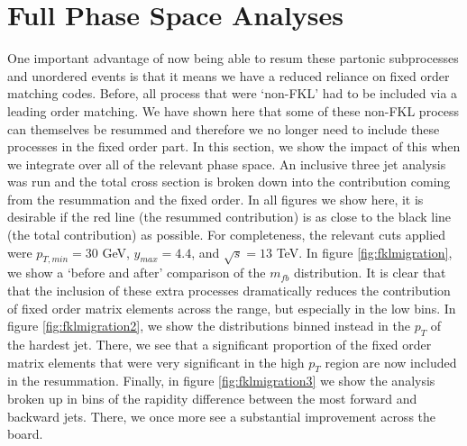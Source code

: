 \section{Full Phase Space Analyses}

One important advantage of now being able to resum these partonic subprocesses and unordered events is that it means we have a reduced reliance on fixed order matching codes. Before, all process that were `non-FKL' had to be included via a leading order matching. We have shown here that some of these non-FKL process can themselves be resummed and therefore we no longer need to include these processes in the fixed order part. In this section, we show the impact of this when we integrate over all of the relevant phase space. An inclusive three jet analysis was run and the total cross section is broken down into the contribution coming from the resummation and the fixed order. In all figures we show here, it is desirable if the red line (the resummed contribution) is as close to the black line (the total contribution) as possible. For completeness, the relevant cuts applied were $p_{T,min} = 30$ GeV, $y_{max} = 4.4$, and $\sqrt{s} = 13$ TeV. In figure \ref{fig:fklmigration}, we show a `before and after' comparison of the $m_{fb}$ distribution. It is clear that that the inclusion of these extra processes dramatically reduces the contribution of fixed order matrix elements across the range, but especially in the low bins. In figure \ref{fig:fklmigration2}, we show the distributions binned instead in the $p_T$ of the hardest jet. There, we see that a significant proportion of the fixed order matrix elements that were very significant in the high $p_T$ region are now included in the resummation. Finally, in figure \ref{fig:fklmigration3} we show the analysis broken up in bins of the rapidity difference between the most forward and backward jets. There, we once more see a substantial improvement across the board. 

